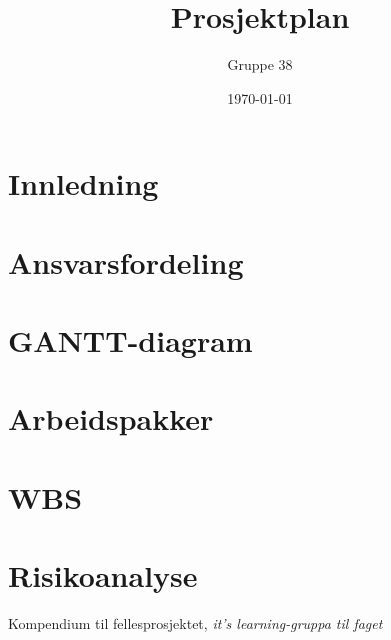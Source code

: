 \documentclass[titlepage]{article}
\author{Gruppe 38}
\title{Prosjektplan}
\date{\today}
\begin{document}
\maketitle

%

\tableofcontents


\newpage
\section{Innledning}


\newpage
\section{Ansvarsfordeling}


\newpage
\section{GANTT-diagram}


\newpage
\section{Arbeidspakker}


\newpage
\section{WBS}


%

\newpage
\section{Risikoanalyse}


\newpage
\listoftables

\newpage
\listoffigures

\newpage
\begin{thebibliography}{9}

	Kompendium til fellesprosjektet,
	\emph{it's learning-gruppa til faget}
\end{thebibliography}
\end{document}
